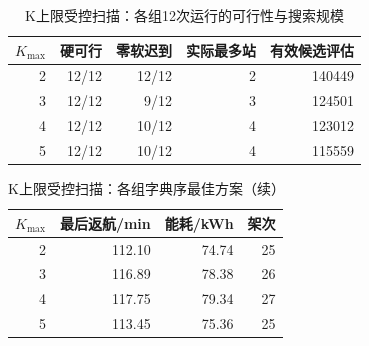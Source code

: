 \begin{table}[H]\centering\normalsize
\caption{K上限受控扫描：各组12次运行的可行性与搜索规模}\label{tab:q2_kmax_scan}
\begin{tabular}{rrrrr}
\toprule
$K_{\max}$ & 硬可行 & 零软迟到 & 实际最多站 & 有效候选评估\\\midrule
2 & 12/12 & 12/12 & 2 & 140449\\
3 & 12/12 & 9/12 & 3 & 124501\\
4 & 12/12 & 10/12 & 4 & 123012\\
5 & 12/12 & 10/12 & 4 & 115559\\
\bottomrule\end{tabular}
\end{table}
\begin{table}[H]\centering\normalsize
\caption{K上限受控扫描：各组字典序最佳方案（续）}\label{tab:q2_kmax_metrics}
\begin{tabular}{rrrr}
\toprule
$K_{\max}$ & 最后返航/min & 能耗/kWh & 架次\\\midrule
2 & 112.10 & 74.74 & 25\\
3 & 116.89 & 78.38 & 26\\
4 & 117.75 & 79.34 & 27\\
5 & 113.45 & 75.36 & 25\\
\bottomrule\end{tabular}
\end{table}
